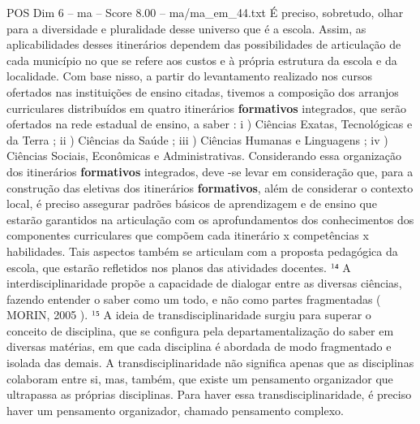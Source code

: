 \begin{textsample}{POS Dim 6 – ma – Score 8.00 – ma/ma\_em\_44.txt}
É preciso, sobretudo, olhar para a diversidade e pluralidade desse universo que é a escola.
Assim, as aplicabilidades desses itinerários dependem das possibilidades de articulação de cada município no que se refere aos custos e à própria estrutura da escola e da localidade.
Com base nisso, a partir do levantamento realizado nos cursos ofertados nas instituições de ensino citadas, tivemos a composição dos arranjos curriculares distribuídos em quatro itinerários \textbf{formativos} integrados, que serão ofertados na rede estadual de ensino, a saber : i ) Ciências Exatas, Tecnológicas e da Terra ; ii ) Ciências da Saúde ; iii ) Ciências Humanas e Linguagens ; iv ) Ciências Sociais, Econômicas e Administrativas.
Considerando essa organização dos itinerários \textbf{formativos} integrados, deve -se levar em consideração que, para a construção das eletivas dos itinerários \textbf{formativos}, além de considerar o contexto local, é preciso assegurar padrões básicos de aprendizagem e de ensino que estarão garantidos na articulação com os aprofundamentos dos conhecimentos dos componentes curriculares que compõem cada itinerário x competências x habilidades.
Tais aspectos também se articulam com a proposta pedagógica da escola, que estarão refletidos nos planos das atividades docentes. ¹⁴ A interdisciplinaridade propõe a capacidade de dialogar entre as diversas ciências, fazendo entender o saber como um todo, e não como partes fragmentadas ( MORIN, 2005 ). ¹⁵ A ideia de transdisciplinaridade surgiu para superar o conceito de disciplina, que se configura pela departamentalização do saber em diversas matérias, em que cada disciplina é abordada de modo fragmentado e isolada das demais.
A transdisciplinaridade não significa apenas que as disciplinas colaboram entre si, mas, também, que existe um pensamento organizador que ultrapassa as próprias disciplinas.
Para haver essa transdisciplinaridade, é preciso haver um pensamento organizador, chamado pensamento complexo.

\end{textsample}
